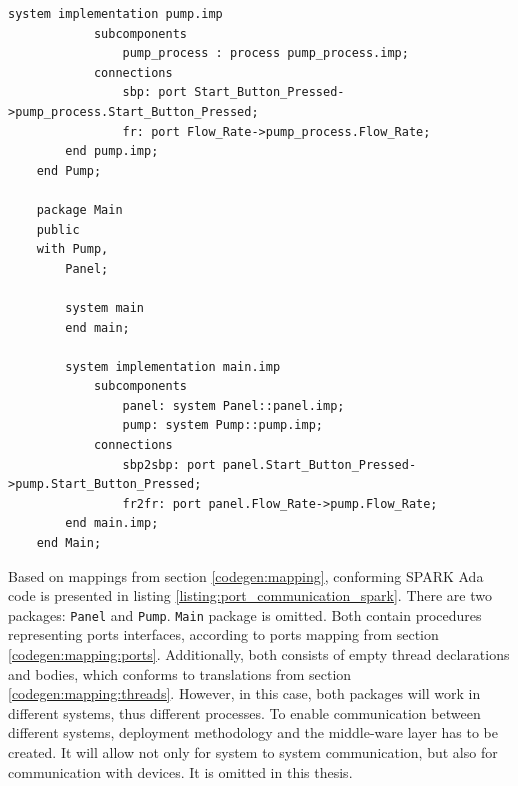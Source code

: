 \begin{lstlisting}[language=aadl, frame=single, gobble=0, caption={AADL model of port communication between systems}, label={listing:port_communication}]
		system implementation pump.imp
			subcomponents
				pump_process : process pump_process.imp;
			connections
				sbp: port Start_Button_Pressed->pump_process.Start_Button_Pressed;
				fr: port Flow_Rate->pump_process.Flow_Rate;
		end pump.imp;
	end Pump;

	package Main
	public
	with Pump,
		Panel;

		system main	
		end main;
		
		system implementation main.imp
			subcomponents
				panel: system Panel::panel.imp;
				pump: system Pump::pump.imp;
			connections
				sbp2sbp: port panel.Start_Button_Pressed->pump.Start_Button_Pressed;
				fr2fr: port panel.Flow_Rate->pump.Flow_Rate;
		end main.imp;
	end Main;
\end{lstlisting} 
\doublespacing

Based on mappings from section \ref{codegen:mapping}, conforming SPARK Ada code is presented in listing \ref{listing:port_communication_spark}. There are two packages: \lstinline{Panel} and \lstinline{Pump}. \lstinline{Main} package is omitted. Both contain procedures representing ports interfaces, according to ports mapping from section \ref{codegen:mapping:ports}. Additionally, both consists of empty thread declarations and bodies, which conforms to translations from section \ref{codegen:mapping:threads}. However, in this case, both packages will work in different systems, thus different processes.  To enable communication between different systems, deployment methodology and the middle-ware layer has to be created. It will allow not only for system to system communication, but also for communication with devices. It is omitted in this thesis.

